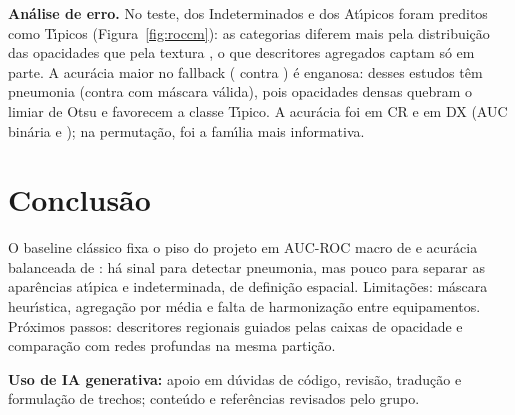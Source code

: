 \documentclass[12pt]{article}
\begin{document}
\textbf{An\'alise de erro.} No teste, \IndToTyp{} dos Indeterminados e \AtyToTyp{} dos
At\'{\i}picos foram preditos como T\'{\i}picos (Figura~\ref{fig:roccm}): as categorias diferem mais
pela distribui\c{c}\~ao das opacidades que pela textura \cite{litmanovich2020review}, o que
descritores agregados captam s\'o em parte. A acur\'acia maior no fallback (\AccMaskFb{}
contra \AccMaskOk{}) \'e enganosa: \PrevPneuMaskFb{} desses estudos t\^em pneumonia (contra
\PrevPneuMaskOk{} com m\'ascara v\'alida), pois opacidades densas quebram o limiar de Otsu e
favorecem a classe T\'{\i}pico. A acur\'acia foi \AccModCR{} em CR e \AccModDX{} em DX (AUC
bin\'aria \BinAUCModCR{} e \BinAUCModDX{}); na permuta\c{c}\~ao, \TopFamily{} foi a fam\'{\i}lia
mais informativa.

\section{Conclus\~ao}

O baseline cl\'assico fixa o piso do projeto em AUC-ROC macro de \TestAUC{} e acur\'acia
balanceada de \TestBalAcc{}: h\'a sinal para detectar pneumonia, mas pouco para separar as
apar\^encias at\'{\i}pica e indeterminada, de defini\c{c}\~ao espacial. Limita\c{c}\~oes: m\'ascara
heur\'{\i}stica, agrega\c{c}\~ao por m\'edia e falta de harmoniza\c{c}\~ao entre equipamentos. Pr\'oximos
passos: descritores regionais guiados pelas caixas de opacidade e compara\c{c}\~ao com redes
profundas na mesma parti\c{c}\~ao.




\noindent\footnotesize\textbf{Uso de IA generativa:} apoio em d\'uvidas de c\'odigo, revis\~ao,
tradu\c{c}\~ao e formula\c{c}\~ao de trechos; conte\'udo e refer\^encias revisados pelo grupo.\normalsize
\end{document}
